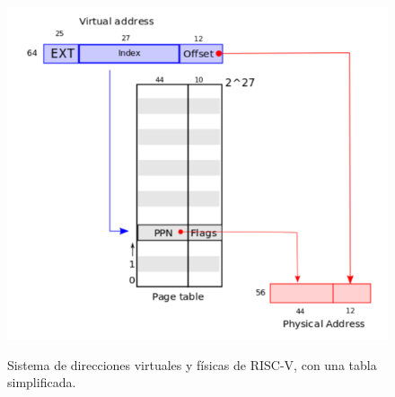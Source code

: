 \documentclass{libs/ufc_format}
\begin{document}
\begin{frame}{}
  \begin{figure}
    \centering
    \caption{Sistema de direcciones virtuales y físicas de RISC-V, con una tabla simplificada. \cite{xv6_book}}
    \includegraphics[scale=0.35]{libs/img/riscv_address.png}
    \label{fig:tabla_paginas_lineal}
  \end{figure}
\end{frame}
\end{document}
